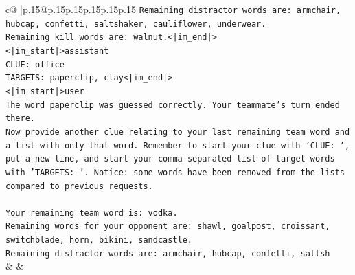 \documentclass{article}
\begin{document}
{\begin{supertabular}{c@{$\;$}|p{.15\linewidth}@{}p{.15\linewidth}p{.15\linewidth}p{.15\linewidth}p{.15\linewidth}p{.15\linewidth}}
{{{\texttt{Remaining distractor words are: armchair, hubcap, confetti, saltshaker, cauliflower, underwear.} \\
\texttt{Remaining kill words are: walnut.<|im\_end|>} \\
\texttt{<|im\_start|>assistant} \\
\texttt{CLUE: office} \\
\texttt{TARGETS: paperclip, clay<|im\_end|>} \\
\texttt{<|im\_start|>user} \\
\texttt{The word paperclip was guessed correctly. Your teammate's turn ended there.} \\
\texttt{Now provide another clue relating to your last remaining team word and a list with only that word. Remember to start your clue with 'CLUE: ', put a new line, and start your comma{-}separated list of target words with 'TARGETS: '. Notice: some words have been removed from the lists compared to previous requests.} \\
\\ 
\texttt{Your remaining team word is: vodka.} \\
\texttt{Remaining words for your opponent are: shawl, goalpost, croissant, switchblade, horn, bikini, sandcastle.} \\
\texttt{Remaining distractor words are: armchair, hubcap, confetti, saltsh} \\
            }
        }
    }
    & & \\ \\


\end{supertabular}}
\end{document}
